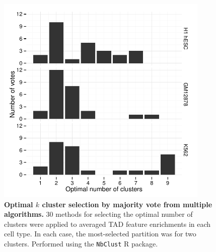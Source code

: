 \documentclass[a4paper,11pt,oneside]{book}
\begin{document}
\restoregeometry


\setcounter{figure}{0}
\makeatletter 
\renewcommand{\thefigure}{S\@arabic\c@figure}
\makeatother

\begin{figure}
\begin{center}
\includegraphics[width=4in]{nbclust.pdf}
\captionsetup{width=\textwidth}
\caption[Optimal $k$ cluster selection by majority vote from multiple algorithms.]{ {\bf Optimal $k$ cluster selection by majority vote from multiple algorithms.}
30 methods for selecting the optimal number of clusters were applied to averaged TAD feature enrichments in each cell type. In each case, the most-selected partition was for two clusters. Performed using the \texttt{NbClust} R package.\cite{Charrad2014}
}\label{fig:nbclust}
\end{center}
\end{figure} 
\end{document}
